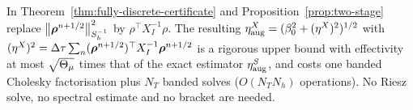 \begin{corollary}\label{cor:cheap}
In Theorem~\ref{thm:fully-discrete-certificate} and Proposition~\ref{prop:two-stage} replace
$\left\lVert \bm\rho^{n+1/2}\right\rVert_{S_h^{-1}}^2$ by $\rho^\top X_I^{-1}\rho$.  The resulting
$\eta^{X}_{\rm aug}=(\beta_0^2+(\eta^X)^2)^{1/2}$ with
$(\eta^X)^2=\Delta\tau\sum_n(\bm\rho^{n+1/2})^\top X_I^{-1}\bm\rho^{n+1/2}$
is a rigorous upper bound with effectivity at most
$\sqrt{\Theta_\mu}$ times that of the exact estimator $\eta^S_{\rm aug}$, and costs one banded
Cholesky factorisation plus $N_T$ banded solves ($O(N_TN_h)$ operations).
No Riesz solve, no spectral estimate and no bracket are needed.
\end{corollary}
